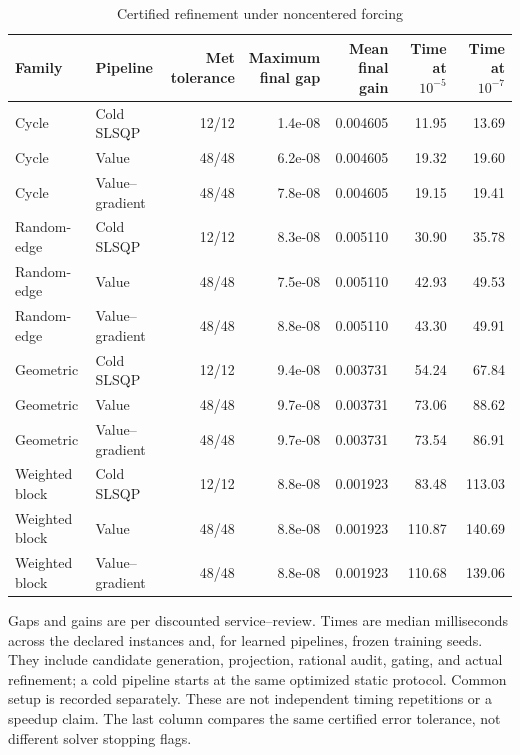 \begin{table}[p]\centering
\caption{Certified refinement under noncentered forcing}\label{tab:r12-matched}
\setlength{\tabcolsep}{3.5pt}\begin{tabular}{llrrrrr}
\toprule
Family & Pipeline & \shortstack{Met\\tolerance} & \shortstack{Maximum\\final gap} & \shortstack{Mean\\final gain} & \shortstack{Time at\\$10^{-5}$} & \shortstack{Time at\\$10^{-7}$} \\
\midrule
Cycle & Cold SLSQP & 12/12 & 1.4e-08 & 0.004605 & 11.95 & 13.69 \\
Cycle & Value & 48/48 & 6.2e-08 & 0.004605 & 19.32 & 19.60 \\
Cycle & Value--gradient & 48/48 & 7.8e-08 & 0.004605 & 19.15 & 19.41 \\
Random-edge & Cold SLSQP & 12/12 & 8.3e-08 & 0.005110 & 30.90 & 35.78 \\
Random-edge & Value & 48/48 & 7.5e-08 & 0.005110 & 42.93 & 49.53 \\
Random-edge & Value--gradient & 48/48 & 8.8e-08 & 0.005110 & 43.30 & 49.91 \\
Geometric & Cold SLSQP & 12/12 & 9.4e-08 & 0.003731 & 54.24 & 67.84 \\
Geometric & Value & 48/48 & 9.7e-08 & 0.003731 & 73.06 & 88.62 \\
Geometric & Value--gradient & 48/48 & 9.7e-08 & 0.003731 & 73.54 & 86.91 \\
Weighted block & Cold SLSQP & 12/12 & 8.8e-08 & 0.001923 & 83.48 & 113.03 \\
Weighted block & Value & 48/48 & 8.8e-08 & 0.001923 & 110.87 & 140.69 \\
Weighted block & Value--gradient & 48/48 & 8.8e-08 & 0.001923 & 110.68 & 139.06 \\
\bottomrule
\end{tabular}
\begin{minipage}{.98\textwidth}\small
Gaps and gains are per discounted service--review. Times are median milliseconds across the declared instances and, for learned pipelines, frozen training seeds. They include candidate generation, projection, rational audit, gating, and actual refinement; a cold pipeline starts at the same optimized static protocol. Common setup is recorded separately. These are not independent timing repetitions or a speedup claim. The last column compares the same certified error tolerance, not different solver stopping flags.
\end{minipage}
\end{table}
